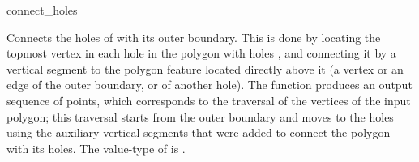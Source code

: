 \begin{ccRefFunction}{connect_holes}
\label{ref_bso_connect_holes}

\ccThreeToTwo

\ccDefinition


{Connects the holes of  with its outer boundary. This is done
 by locating the topmost vertex in each hole in the polygon with holes
 , and connecting it by a vertical segment to the polygon
 feature located directly above it (a vertex or an edge of the outer
 boundary, or of another hole). The function produces an output
 sequence of points, which corresponds to the traversal of the vertices
 of the input polygon; this traversal starts from the outer boundary
 and moves to the holes using the auxiliary vertical segments that
 were added to connect the polygon with its holes. The value-type
 of  is .
 }

\end{ccRefFunction}

\ccRefPageEnd
